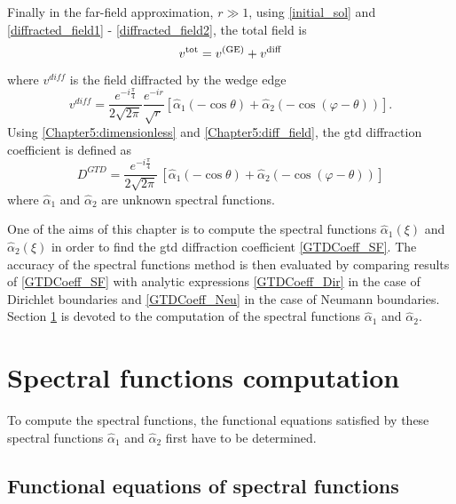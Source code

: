 Finally in the far-field approximation, $r \gg 1$, using \eqref{initial_sol} and \eqref{diffracted_field1} - \eqref{diffracted_field2}, the total field is 
\begin{equation}
v^{\rm tot} = v^{\rm (GE)} + v^{\rm diff}
\end{equation}
where $v^{diff}$ is the field diffracted by the wedge edge
\begin{equation}
\label{Chapter5:diff_field}
v^{ diff} = \dfrac{e^{-i\frac{\pi}{4}}}{2\sqrt{2\pi}} \dfrac{e^{-ir}}{\sqrt{r}} [\hat{\alpha}_1( - \cos \theta) + \hat{\alpha}_2( - \cos ( \varphi - \theta))].
\end{equation}
Using \eqref{Chapter5:dimensionless} and \eqref{Chapter5:diff_field}, the \acrshort{gtd} diffraction coefficient is defined as
\begin{equation}
\label{GTDCoeff_SF}
D^{GTD} = \dfrac{e^{-i\frac{\pi}{4}}}{2\sqrt{2\pi}} \, [\hat{\alpha}_1( - \cos \theta) + \hat{\alpha}_2( - \cos ( \varphi - \theta))]
\end{equation}
where $\hat{\alpha}_1$ and $\hat{\alpha}_2$ are unknown spectral functions. 

One of the aims of this chapter is to compute the spectral functions $\hat{\alpha}_1(\xi)$ and $\hat{\alpha}_2(\xi)$ in order to find the \acrshort{gtd} diffraction coefficient \eqref{GTDCoeff_SF}. The accuracy of the spectral functions method is then evaluated by comparing results of \eqref{GTDCoeff_SF} with analytic expressions \eqref{GTDCoeff_Dir} in the case of Dirichlet boundaries and \eqref{GTDCoeff_Neu} in the case of Neumann boundaries. Section \ref{Chapter5:resolution} is devoted to the computation of the spectral functions $\hat{\alpha}_1$ and $\hat{\alpha}_2$.

\section{Spectral functions computation}
\label{Chapter5:resolution}

To compute the spectral functions, the functional equations satisfied by these spectral functions $\hat{\alpha}_1$ and $\hat{\alpha}_2$ first have to be determined.
\subsection{Functional equations of spectral functions}
\label{C2:functional_system}


